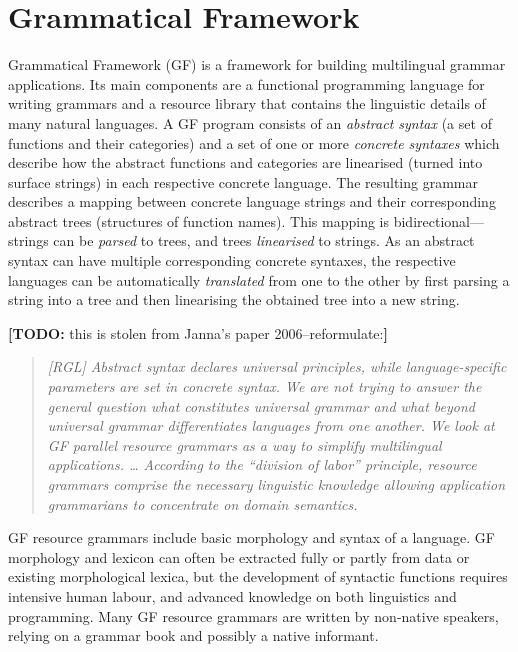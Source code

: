 \documentclass[11pt]{article}
\newcommand{\todo}[1]{{\color{cyan}\textbf{[TODO: }#1\textbf{]}}}
\begin{document}
\section{Grammatical Framework}
Grammatical Framework (GF) \cite{ranta2004gf} 
is a framework for building multilingual grammar applications. Its main
components are a functional programming language for writing grammars
and a resource library \cite{ranta2009rgl} that contains the linguistic details of many
natural languages.
A GF program consists of an \emph{abstract syntax} (a set of functions
and their categories) and a set of one or more
\emph{concrete syntaxes} which describe how the abstract
functions and categories are linearised (turned into surface strings) in each
respective concrete language. The resulting grammar
describes a mapping between concrete language strings and
their corresponding abstract trees (structures of function names).
This mapping is bidirectional---strings can be \emph{parsed} to
trees, and trees \emph{linearised} to strings.
As an abstract syntax can have multiple corresponding concrete syntaxes,
the respective languages can be automatically \emph{translated} from one to the other by
first parsing a string into a tree and then linearising the obtained tree
into a new string.

\todo{this is stolen from Janna's paper 2006--reformulate:}
\begin{quote} { \em [RGL] Abstract syntax declares universal principles, while language-specific
parameters are set in concrete syntax. We are not trying to answer the
general question what constitutes universal grammar and what beyond
universal grammar differentiates languages from one another. We look
at GF parallel resource grammars as a way to simplify multilingual
applications. \dots
According to the ``division of labor'' principle, resource grammars
comprise the necessary linguistic knowledge allowing application
grammarians to concentrate on domain semantics.}
\end{quote}

GF resource grammars include basic morphology and syntax of a
language. GF morphology and lexicon can often be extracted fully or
partly from data or existing morphological lexica, but the development
of syntactic functions requires intensive human labour, and advanced
knowledge on both linguistics and programming. 
Many GF resource grammars are written by non-native speakers, relying
on a grammar book and possibly a native informant. 

\end{document}

